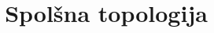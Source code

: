 \documentclass[11pt, a4paper]{article}
\theoremstyle{definition}{
    \newtheorem{definicija}{Definicija}[section]
    \newtheorem{izrek}{Izrek}[section]
    \newtheorem{trditev}[izrek]{Trditev}
    \newtheorem{posledica}{Posledica}[izrek]
    \newtheorem{lema}[izrek]{Lema}
    \newtheorem{aksiom}[izrek]{Aksiom}
    \newtheorem*{opomba}{Opomba}
    \newtheorem*{primer}{Primer} 
    \newtheorem*{zgled}{Zgled} 
}
\begin{document}
\title{Spolšna topologija}
\maketitle



\newpage


\newpage

\end{document}

